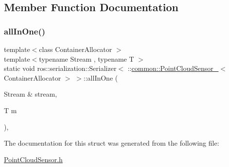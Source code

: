 \subsection{Member Function Documentation}
\mbox{\label{structros_1_1serialization_1_1Serializer_3_01_1_1common_1_1PointCloudSensor___3_01ContainerAllocator_01_4_01_4_a06d2fbcc6527f514d2bc53b414710c7b}} 
\subsubsection{\texorpdfstring{all\+In\+One()}{allInOne()}}
{\footnotesize\ttfamily template$<$class Container\+Allocator $>$ \\
template$<$typename Stream , typename T $>$ \\
static void ros\+::serialization\+::\+Serializer$<$ \+::\hyperlink{structcommon_1_1PointCloudSensor__}{common\+::\+Point\+Cloud\+Sensor\+\_\+}$<$ Container\+Allocator $>$ $>$\+::all\+In\+One (\begin{DoxyParamCaption}\item[{Stream \&}]{stream,  }\item[{T}]{m }\end{DoxyParamCaption})\hspace{0.3cm}{\ttfamily [inline]}, {\ttfamily [static]}}



The documentation for this struct was generated from the following file\+:\begin{DoxyCompactItemize}
\item 
\hyperlink{PointCloudSensor_8h}{Point\+Cloud\+Sensor.\+h}\end{DoxyCompactItemize}
